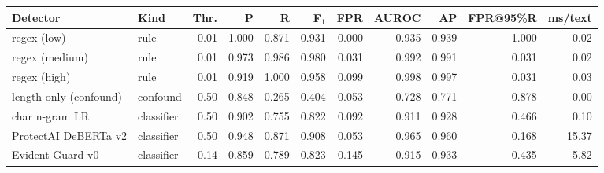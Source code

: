 \begin{tabular}{@{}llrrrrrrrrr@{}}
\toprule
Detector & Kind & Thr. & P & R & F$_1$ & FPR & AUROC & AP & FPR@95\%R & ms/text \\
\midrule
regex (low) & rule & 0.01 & 1.000 & 0.871 & 0.931 & 0.000 & 0.935 & 0.939 & 1.000 & 0.02 \\
regex (medium) & rule & 0.01 & 0.973 & 0.986 & 0.980 & 0.031 & 0.992 & 0.991 & 0.031 & 0.02 \\
regex (high) & rule & 0.01 & 0.919 & 1.000 & 0.958 & 0.099 & 0.998 & 0.997 & 0.031 & 0.03 \\
length-only (confound) & confound & 0.50 & 0.848 & 0.265 & 0.404 & 0.053 & 0.728 & 0.771 & 0.878 & 0.00 \\
char n-gram LR & classifier & 0.50 & 0.902 & 0.755 & 0.822 & 0.092 & 0.911 & 0.928 & 0.466 & 0.10 \\
ProtectAI DeBERTa v2 & classifier & 0.50 & 0.948 & 0.871 & 0.908 & 0.053 & 0.965 & 0.960 & 0.168 & 15.37 \\
Evident Guard v0 & classifier & 0.14 & 0.859 & 0.789 & 0.823 & 0.145 & 0.915 & 0.933 & 0.435 & 5.82 \\
\bottomrule
\end{tabular}
